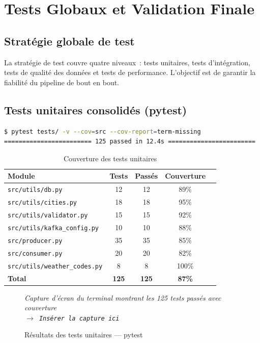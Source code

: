 \documentclass[a4paper,12pt,oneside]{report}
\newcommand{\imgplaceholder}[2]{%
  \begin{tcolorbox}[colback=blue!5,colframe=blue!40,title=#1]
    \centering\itshape #2\\[6pt]
    \texttt{$\rightarrow$ Insérer la capture ici}
  \end{tcolorbox}
}
\begin{document}
\chapter{Tests Globaux et Validation Finale}

\section{Stratégie globale de test}
La stratégie de test couvre quatre niveaux~: tests unitaires, tests d'intégration, tests de qualité des données et tests de performance. L'objectif est de garantir la fiabilité du pipeline de bout en bout.

\section{Tests unitaires consolidés (pytest)}

\begin{lstlisting}[language=bash,caption={Exécution des tests unitaires}]
$ pytest tests/ -v --cov=src --cov-report=term-missing
======================== 125 passed in 12.4s ========================
\end{lstlisting}

\begin{table}[H]\centering\caption{Couverture des tests unitaires}\label{tab:coverage}
\begin{tabularx}{\textwidth}{Xcccc}\toprule
\textbf{Module} & \textbf{Tests} & \textbf{Passés} & \textbf{Couverture} \\\midrule
\texttt{src/utils/db.py} & 12 & 12 & 89\% \\
\texttt{src/utils/cities.py} & 18 & 18 & 95\% \\
\texttt{src/utils/validator.py} & 15 & 15 & 92\% \\
\texttt{src/utils/kafka\_config.py} & 10 & 10 & 88\% \\
\texttt{src/producer.py} & 35 & 35 & 85\% \\
\texttt{src/consumer.py} & 20 & 20 & 82\% \\
\texttt{src/utils/weather\_codes.py} & 8 & 8 & 100\% \\
\midrule
\textbf{Total} & \textbf{125} & \textbf{125} & \textbf{87\%} \\\bottomrule
\end{tabularx}\end{table}

\begin{figure}[H]\centering
\imgplaceholder{Résultats pytest}{Capture d'écran du terminal montrant les 125 tests passés avec couverture}
\caption{Résultats des tests unitaires — pytest}\label{fig:pytest}\end{figure}
\end{document}
